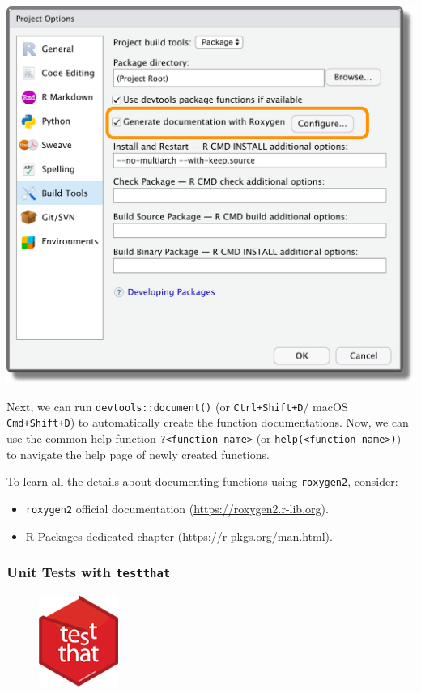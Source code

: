 \documentclass[
  11pt,
]{book}
\providecommand{\tightlist}{%
  \setlength{\itemsep}{0pt}\setlength{\parskip}{0pt}}
\begin{document}
\begin{center}\includegraphics[width=0.7\linewidth]{images/coding/settings-doc} \end{center}

Next, we can run \texttt{devtools::document()} (or \texttt{Ctrl+Shift+D}/ macOS \texttt{Cmd+Shift+D}) to automatically create the function documentations. Now, we can use the common help function \texttt{?\textless{}function-name\textgreater{}} (or \texttt{help(\textless{}function-name\textgreater{})}) to navigate the help page of newly created functions.

To learn all the details about documenting functions using \texttt{roxygen2}, consider:

\begin{itemize}
\tightlist
\item
  \texttt{roxygen2} official documentation (\url{https://roxygen2.r-lib.org}).
\item
  R Packages dedicated chapter (\url{https://r-pkgs.org/man.html}).
\end{itemize}

\hypertarget{testthat}{%
\subsubsection{\texorpdfstring{Unit Tests with \texttt{testthat}}{Unit Tests with testthat}}\label{testthat}}

\begin{figure}
  \vspace*{-15pt}
  \begin{center}
    \includegraphics[width=0.23\textwidth]{images/coding/test-that.png}
  \end{center}
  \vspace{-15pt}
\end{figure}
\end{document}

